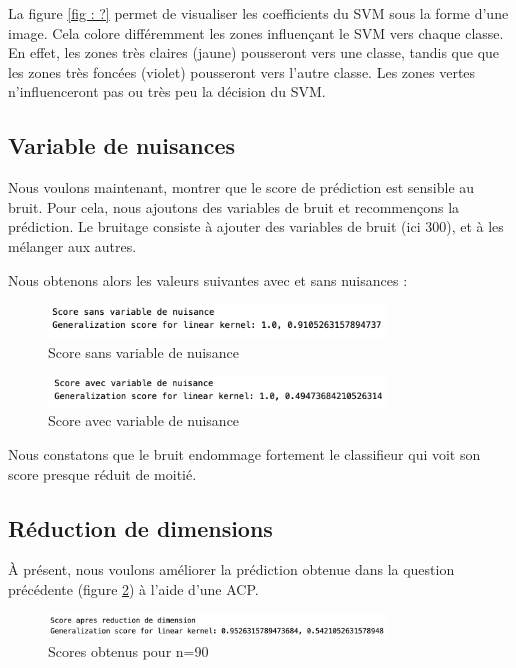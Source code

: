 \documentclass[a4paper,12pt]{article}
\begin{document}
La figure \ref{fig : ?} permet de visualiser les coefficients du SVM sous la forme d'une image.
Cela colore différemment les zones influençant le SVM vers chaque classe. 
En effet, les zones très claires (jaune) pousseront vers une classe, tandis que que les zones très foncées (violet) pousseront vers l'autre classe.
Les zones vertes n'influenceront pas ou très peu la décision du SVM.

\subsection{Variable de nuisances}

Nous voulons maintenant, montrer que le score de prédiction est sensible au bruit. Pour cela, nous ajoutons des variables de bruit et
recommençons la prédiction. Le bruitage consiste à ajouter des variables de bruit (ici 300), et à les mélanger aux autres. 

Nous obtenons alors les valeurs suivantes avec et sans nuisances :

\begin{figure}[H]
    \centering
    \includegraphics[width=0.8\textwidth]{Images/sans_variable.png}
    \caption{Score sans variable de nuisance}\label{fig: sans}
\end{figure}

\begin{figure}[H]
    \centering
    \includegraphics[width=0.8\textwidth]{Images/avec_variable.png}
    \caption{Score avec variable de nuisance}\label{fig: avec}
\end{figure}

Nous constatons que le bruit endommage fortement le classifieur qui voit son score presque réduit de moitié.

\subsection{Réduction de dimensions}

À présent, nous voulons améliorer la prédiction obtenue dans la question précédente (figure \ref{fig: avec}) à l'aide d'une ACP.

\begin{figure}[H]
    \centering
    \includegraphics[width=0.8\textwidth]{Images/apres_reduction.png}
    \caption{Scores obtenus pour n=90}\label{fig : dim}
\end{figure}
\end{document}
